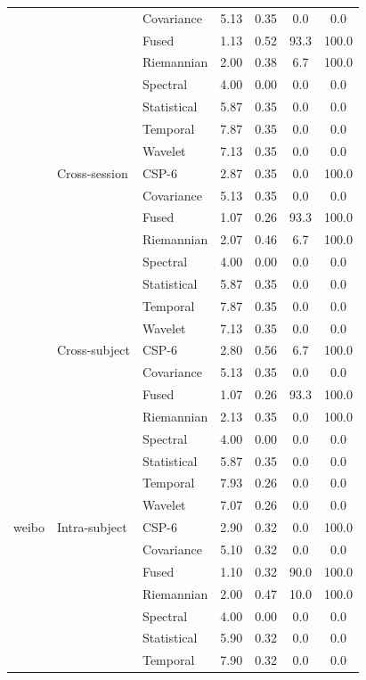 \begin{table}[t]
\begin{tabular}{lllcccc}
 &  & Covariance & 5.13 & 0.35 & 0.0 & 0.0 \\
 &  & Fused & 1.13 & 0.52 & 93.3 & 100.0 \\
 &  & Riemannian & 2.00 & 0.38 & 6.7 & 100.0 \\
 &  & Spectral & 4.00 & 0.00 & 0.0 & 0.0 \\
 &  & Statistical & 5.87 & 0.35 & 0.0 & 0.0 \\
 &  & Temporal & 7.87 & 0.35 & 0.0 & 0.0 \\
 &  & Wavelet & 7.13 & 0.35 & 0.0 & 0.0 \\
\addlinespace[3pt]
 & Cross-session & CSP-6 & 2.87 & 0.35 & 0.0 & 100.0 \\
 &  & Covariance & 5.13 & 0.35 & 0.0 & 0.0 \\
 &  & Fused & 1.07 & 0.26 & 93.3 & 100.0 \\
 &  & Riemannian & 2.07 & 0.46 & 6.7 & 100.0 \\
 &  & Spectral & 4.00 & 0.00 & 0.0 & 0.0 \\
 &  & Statistical & 5.87 & 0.35 & 0.0 & 0.0 \\
 &  & Temporal & 7.87 & 0.35 & 0.0 & 0.0 \\
 &  & Wavelet & 7.13 & 0.35 & 0.0 & 0.0 \\
\addlinespace[3pt]
 & Cross-subject & CSP-6 & 2.80 & 0.56 & 6.7 & 100.0 \\
 &  & Covariance & 5.13 & 0.35 & 0.0 & 0.0 \\
 &  & Fused & 1.07 & 0.26 & 93.3 & 100.0 \\
 &  & Riemannian & 2.13 & 0.35 & 0.0 & 100.0 \\
 &  & Spectral & 4.00 & 0.00 & 0.0 & 0.0 \\
 &  & Statistical & 5.87 & 0.35 & 0.0 & 0.0 \\
 &  & Temporal & 7.93 & 0.26 & 0.0 & 0.0 \\
 &  & Wavelet & 7.07 & 0.26 & 0.0 & 0.0 \\
\midrule
weibo & Intra-subject & CSP-6 & 2.90 & 0.32 & 0.0 & 100.0 \\
 &  & Covariance & 5.10 & 0.32 & 0.0 & 0.0 \\
 &  & Fused & 1.10 & 0.32 & 90.0 & 100.0 \\
 &  & Riemannian & 2.00 & 0.47 & 10.0 & 100.0 \\
 &  & Spectral & 4.00 & 0.00 & 0.0 & 0.0 \\
 &  & Statistical & 5.90 & 0.32 & 0.0 & 0.0 \\
 &  & Temporal & 7.90 & 0.32 & 0.0 & 0.0 \\

\end{tabular}
\end{table}
